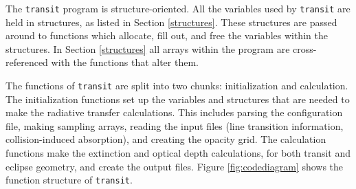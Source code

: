 \documentclass[letterpaper,12pt]{article}
\begin{document}
The \texttt{transit} program is structure-oriented. All the variables used by \texttt{transit} are held in structures, as listed in Section \ref{structures}. These structures are passed around to functions which allocate, fill out, and free the variables within the structures. In Section \ref{structures} all arrays within the program are cross-referenced with the functions that alter them.

The functions of {\tt transit} are split into two chunks: initialization and calculation. The initialization functions set up the variables and structures that are needed to make the radiative transfer calculations. This includes parsing the configuration file, making sampling arrays, reading the input files (line transition information, collision-induced absorption), and creating the opacity grid. The calculation functions make the extinction and optical depth calculations, for both transit and eclipse geometry, and create the output files. Figure \ref{fig:codediagram} shows the function structure of {\tt transit}.
\end{document}
